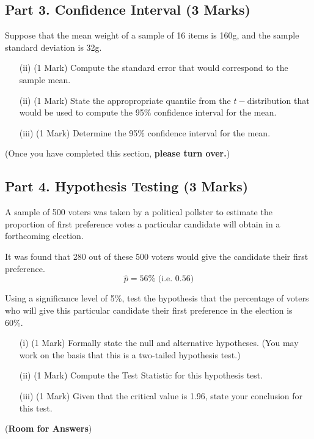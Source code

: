 \subsection*{Part 3. Confidence Interval (3 Marks)}

Suppose that the mean weight of a sample of 16 items is 160g, and the sample standard deviation is 32g.



\begin{itemize}
\item[(ii)] (1 Mark) Compute the standard error that would correspond to the sample mean.
\item[(ii)] (1 Mark) State the appropropriate quantile from the $t-$distribution that would be used to compute the 95\% confidence interval for the mean.
\item[(iii)] (1 Mark) Determine the 95\% confidence interval for the mean.
\end{itemize}
(Once you have completed this section, \textbf{please turn over.})
\newpage
\subsection*{Part 4. Hypothesis Testing (3 Marks)}

\noindent A sample of 500 voters was taken by a political pollster to estimate the proportion of first preference votes a particular candidate will obtain in a forthcoming election. \\
\bigskip

\noindent It was found that 280 out of these 500 voters would give the candidate their first preference.
\[\hat{p} = 56\%  \mbox{    (i.e.  } 0.56)\]

\vspace{0.4cm}
\noindent
Using a significance level of 5\%, test the hypothesis that the percentage of voters who will give this particular candidate their first preference in the election is 60\%.\\


\begin{itemize}
\item[(i)] (1 Mark) Formally state the null and alternative hypotheses. (You may work on the basis that this is a two-tailed hypothesis test.)

\item[(ii)] (1 Mark) Compute the Test Statistic for this hypothesis test.
\item[(iii)] (1 Mark) Given that the critical value is 1.96, state your conclusion for this test.
\end{itemize}
\newpage
(\textbf{Room for Answers})
\newpage
